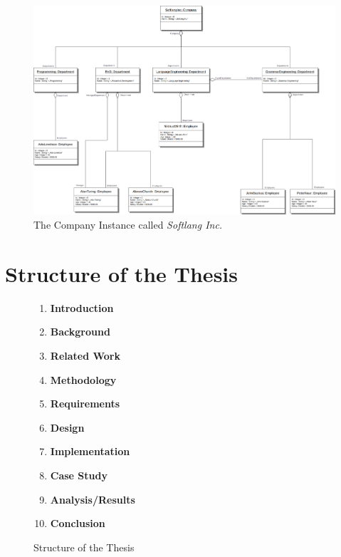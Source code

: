 \documentclass[runningheads,a4paper]{llncs}
\begin{document}
\begin{figure}
\label{figure:TheCompanyInstanceCalledSoftlangInc}
\centering
\includegraphics[width=.9\textwidth]{softlanginc.png}
\caption{The Company Instance called \textit{Softlang Inc.}}
\end{figure}

\section{Structure of the Thesis}
\label{section:StructureOfTheThesis}

\begin{figure}
\begin{center}
\begin{minipage}[t]{0.5\textwidth}
\begin{enumerate}

\item
\textbf{Introduction}

\item
\textbf{Background}

\item
\textbf{Related Work}

\item
\textbf{Methodology}

\item
\textbf{Requirements}

\item
\textbf{Design}

\item
\textbf{Implementation}

\item
\textbf{Case Study}

\item
\textbf{Analysis/Results}

\item
\textbf{Conclusion}

\end{enumerate}
\end{minipage}
\end{center}
\caption{Structure of the Thesis}
\end{figure}
\end{document}
